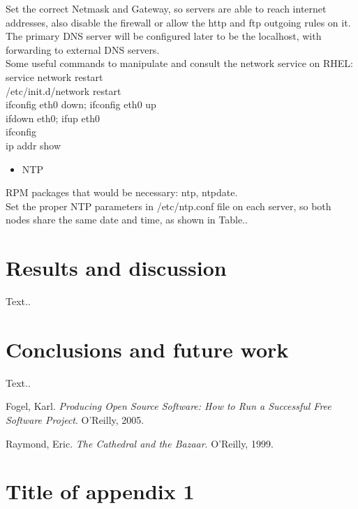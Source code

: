 \documentclass[a4paper, 12pt]{book}
\begin{document}
\noindent Set the correct Netmask and Gateway, so servers are able to reach internet addresses, also disable the firewall or allow the http and ftp outgoing rules on it. The primary DNS server will be configured later to be the localhost, with forwarding to external DNS servers.\\

\noindent Some useful commands to manipulate and consult the network service on RHEL:\\

\noindent service network restart\\
/etc/init.d/network restart\\
ifconfig eth0 down; ifconfig eth0 up\\
ifdown eth0; ifup eth0\\
ifconfig\\
ip addr show\\

\begin{itemize}
	\item NTP
\end{itemize}

\noindent RPM packages that would be necessary: ntp, ntpdate.\\

\noindent Set the proper NTP parameters in /etc/ntp.conf file on each server, so both nodes share the same date and time, as shown in Table..\\



%
\chapter{Results and discussion}
\label{chap:results}

Text..


%
\chapter{Conclusions and future work}
\label{chap:conclusions}

Text..

%
\renewcommand{\bibname}{References}

\begin{thebibliography}{25}
  

   Fogel, Karl. \textit{Producing Open Source Software: How to Run a Successful Free Software Project}. O'Reilly, 2005.

   Raymond, Eric. \textit{The Cathedral and the Bazaar}. O'Reilly, 1999.

\end{thebibliography}

%
\appendix
\chapter{Title of appendix 1}
\label{app:apendix1}
\end{document}
